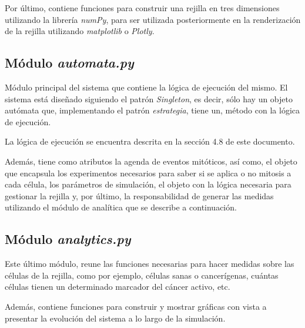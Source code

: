 Por último, contiene funciones para construir una rejilla en tres dimensiones utilizando
la librería \textit{numPy}, para ser utilizada posteriormente en la renderización de la rejilla utilizando \textit{matplotlib}
o \textit{Plotly}.

\subsection{Módulo \textit{automata.py}}

Módulo principal del sistema que contiene la lógica de ejecución del mismo. El sistema
está diseñado siguiendo el patrón \textit{Singleton}, es decir, sólo hay un objeto
autómata que, implementando el patrón \textit{estrategia}, tiene un, método con
la lógica de ejecución.

La lógica de ejecución se encuentra descrita en la sección 4.8 de este documento.

Además, tiene como atributos la agenda de eventos mitóticos, así como, el objeto que
encapsula los experimentos necesarios para saber si se aplica o no mitosis a cada célula, los
parámetros de simulación, el objeto con la lógica necesaria para gestionar la rejilla y, por último,
la responsabilidad de generar las medidas utilizando el módulo de analítica que se describe a continuación.

\subsection{Módulo \textit{analytics.py}}

Este último módulo, reune las funciones necesarias para hacer medidas sobre las células
de la rejilla, como por ejemplo, células sanas o cancerígenas, cuántas células tienen un
determinado marcador del cáncer activo, etc.

Además, contiene funciones para construir y mostrar gráficas con vista a presentar la evolución
del sistema a lo largo de la simulación.
